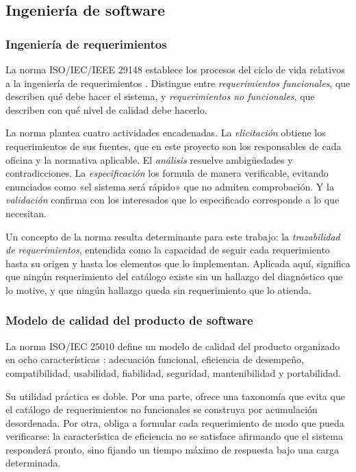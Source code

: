 \subsection{Ingeniería de software}
\label{subsec:mt_ingenieria}

\subsubsection{Ingeniería de requerimientos}

La norma ISO/IEC/IEEE 29148 establece los procesos del ciclo de vida relativos a la ingeniería de requerimientos \cite{iso29148}. Distingue entre \emph{requerimientos funcionales}, que describen qué debe hacer el sistema, y \emph{requerimientos no funcionales}, que describen con qué nivel de calidad debe hacerlo.

La norma plantea cuatro actividades encadenadas. La \emph{elicitación} obtiene los requerimientos de sus fuentes, que en este proyecto son los responsables de cada oficina y la normativa aplicable. El \emph{análisis} resuelve ambigüedades y contradicciones. La \emph{especificación} los formula de manera verificable, evitando enunciados como «el sistema será rápido» que no admiten comprobación. Y la \emph{validación} confirma con los interesados que lo especificado corresponde a lo que necesitan.

Un concepto de la norma resulta determinante para este trabajo: la \emph{trazabilidad de requerimientos}, entendida como la capacidad de seguir cada requerimiento hasta su origen y hasta los elementos que lo implementan. Aplicada aquí, significa que ningún requerimiento del catálogo existe sin un hallazgo del diagnóstico que lo motive, y que ningún hallazgo queda sin requerimiento que lo atienda.

\subsubsection{Modelo de calidad del producto de software}

La norma ISO/IEC 25010 define un modelo de calidad del producto organizado en ocho características \cite{iso25010}: adecuación funcional, eficiencia de desempeño, compatibilidad, usabilidad, fiabilidad, seguridad, mantenibilidad y portabilidad.

Su utilidad práctica es doble. Por una parte, ofrece una taxonomía que evita que el catálogo de requerimientos no funcionales se construya por acumulación desordenada. Por otra, obliga a formular cada requerimiento de modo que pueda verificarse: la característica de eficiencia no se satisface afirmando que el sistema responderá pronto, sino fijando un tiempo máximo de respuesta bajo una carga determinada.

